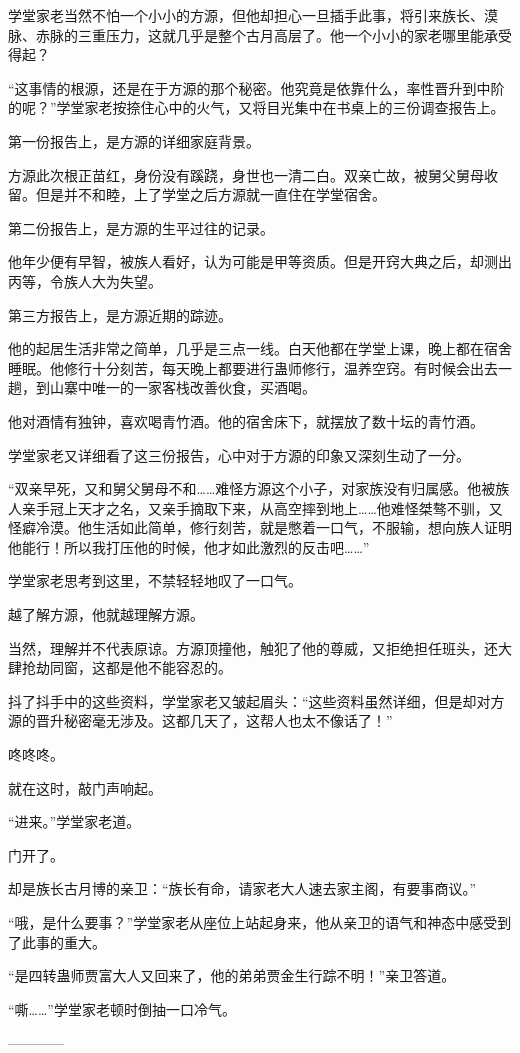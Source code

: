 \begin{this_body}
学堂家老当然不怕一个小小的方源，但他却担心一旦插手此事，将引来族长、漠脉、赤脉的三重压力，这就几乎是整个古月高层了。他一个小小的家老哪里能承受得起？

“这事情的根源，还是在于方源的那个秘密。他究竟是依靠什么，率性晋升到中阶的呢？”学堂家老按捺住心中的火气，又将目光集中在书桌上的三份调查报告上。

第一份报告上，是方源的详细家庭背景。

方源此次根正苗红，身份没有蹊跷，身世也一清二白。双亲亡故，被舅父舅母收留。但是并不和睦，上了学堂之后方源就一直住在学堂宿舍。

第二份报告上，是方源的生平过往的记录。

他年少便有早智，被族人看好，认为可能是甲等资质。但是开窍大典之后，却测出丙等，令族人大为失望。

第三方报告上，是方源近期的踪迹。

他的起居生活非常之简单，几乎是三点一线。白天他都在学堂上课，晚上都在宿舍睡眠。他修行十分刻苦，每天晚上都要进行蛊师修行，温养空窍。有时候会出去一趟，到山寨中唯一的一家客栈改善伙食，买酒喝。

他对酒情有独钟，喜欢喝青竹酒。他的宿舍床下，就摆放了数十坛的青竹酒。

学堂家老又详细看了这三份报告，心中对于方源的印象又深刻生动了一分。

“双亲早死，又和舅父舅母不和……难怪方源这个小子，对家族没有归属感。他被族人亲手冠上天才之名，又亲手摘取下来，从高空摔到地上……他难怪桀骜不驯，又怪癖冷漠。他生活如此简单，修行刻苦，就是憋着一口气，不服输，想向族人证明他能行！所以我打压他的时候，他才如此激烈的反击吧……”

学堂家老思考到这里，不禁轻轻地叹了一口气。

越了解方源，他就越理解方源。

当然，理解并不代表原谅。方源顶撞他，触犯了他的尊威，又拒绝担任班头，还大肆抢劫同窗，这都是他不能容忍的。

抖了抖手中的这些资料，学堂家老又皱起眉头：“这些资料虽然详细，但是却对方源的晋升秘密毫无涉及。这都几天了，这帮人也太不像话了！”

咚咚咚。

就在这时，敲门声响起。

“进来。”学堂家老道。

门开了。

却是族长古月博的亲卫：“族长有命，请家老大人速去家主阁，有要事商议。”

“哦，是什么要事？”学堂家老从座位上站起身来，他从亲卫的语气和神态中感受到了此事的重大。

“是四转蛊师贾富大人又回来了，他的弟弟贾金生行踪不明！”亲卫答道。

“嘶……”学堂家老顿时倒抽一口冷气。

------------

\end{this_body}

